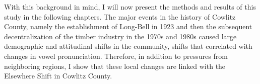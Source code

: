 With this background in mind, I will now present the methods and results of this study in the following chapters. The major events in the history of Cowlitz County, namely the establishment of Long-Bell in 1923 and then the subsequent decentralization of the timber industry in the 1970s and 1980s caused large demographic and attitudinal shifts in the community, shifts that correlated with changes in vowel pronunciation. Therefore, in addition to pressures from neighboring regions, I show that these local changes are linked with the Elsewhere Shift in Cowlitz County.
